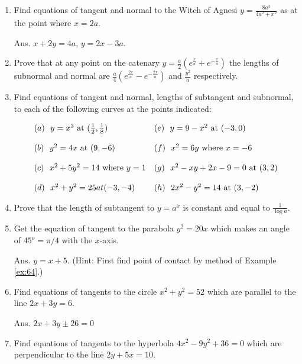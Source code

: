 \begin{enumerate}
\item
Find equations of tangent and normal to the  Witch of Agnesi 
$y = \frac{8a^3}{4a^2 + x^2}$ as at the point where $x = 2a$.

Ans. $x + 2y = 4a$, $y = 2x - 3a$.

\item
Prove that at any point on the catenary 
$y = \frac{a}{2}(e^{\frac{x}{a}} + e^{-\frac{x}{a}})$ 
the lengths of subnormal and normal are 
$\frac{a}{4}(e^{\frac{2x}{a}} - e^{-\frac{2x}{a}})$ and 
$\frac{y^2}{a}$ respectively.

\item
Find equations of tangent and normal, lengths of subtangent 
and subnormal, to each of the following curves at the points indicated:

\[
\begin{array}{ll}
(a)\ \  y = x^3\ {\rm at}\ 
(\frac{1}{2}, \frac{1}{8}) & 	(e)\ \  y = 9-x^2 \ {\rm at}\ (-3,0)\\
 & \\
(b)\ \  y^2 = 4x \ {\rm at}\  (9,-6) & 	(f)\ \  x^2 = 6y \ {\rm where}\ x = -6\\
 & \\
(c)\ \  x^2 + 5y^2 = 14\ {\rm where}\  y = 1 &	(g)\ \  x^2 - xy + 2x - 9 = 0\ {\rm at}\ (3,2)\\
 & \\
(d)\ \  x^2 + y^2 = 25 at (-3,-4)  & (h)\ \  2x^2 - y^2 = 14\ {\rm at}\ (3,-2)
\end{array}
\]

\item
Prove that the length of subtangent to $y = a^x$ is 
constant and equal to $\frac{1}{\log a}$.

\item
Get the equation of tangent to the parabola 
$y^2 = 20x$ which makes an angle of 
$45^o=\pi/4$ with the %
$x$-axis.

Ans. $y = x + 5$.
(Hint: First find point of contact by method of 
Example \ref{ex:64}.) %

\item
Find equations of tangents to the circle $x^2 + y^2 = 52$ which 
are parallel to the line $2x + 3y = 6$.

Ans. $2x + 3y \pm 26 = 0$

\item
Find equations of tangents to the hyperbola 
$4x^2 - 9y^2 + 36 = 0$ which are perpendicular to the line 
$2y + 5x = 10$.


\end{enumerate}
